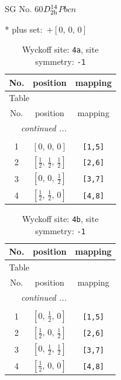 \documentclass[fleqn,8pt]{jsarticle}
\begin{document}
\setcounter{MaxMatrixCols}{32}

\renewcommand{\tablename}{Table~}
\renewcommand{\figurename}{Figure~}
\begin{center}
\LARGE
SG No. 60\quad$D_{\rm 2h}^{14}$\quad$Pbcn$\quad[ orthorhombic ]
\end{center}
* plus set:\,\,\,$+\left[ 0,\, 0,\, 0 \right]$
\renewcommand{\arraystretch}{1.2}
\begin{longtable}{ccc}
\caption{Wyckoff site: {\tt 4a}, site symmetry: {\tt -1}}
 \\
 \hline \hline
No. & position & mapping \\ \hline \endfirsthead

\multicolumn{2}{l}{\tablename\ \thetable{}} \\
 \hline \hline
No. & position & mapping \\ \hline \endhead

 \hline \hline
\multicolumn{2}{r}{\footnotesize\it continued ...} \\ \endfoot

 \hline \hline
\multicolumn{2}{r}{} \\ \endlastfoot

1 & $\left[ 0,\, 0,\, 0 \right]$ & {\tt [1,5]} \\ \hline
2 & $\left[ \frac{1}{2},\, \frac{1}{2},\, \frac{1}{2} \right]$ & {\tt [2,6]} \\ \hline
3 & $\left[ 0,\, 0,\, \frac{1}{2} \right]$ & {\tt [3,7]} \\ \hline
4 & $\left[ \frac{1}{2},\, \frac{1}{2},\, 0 \right]$ & {\tt [4,8]} \\
\end{longtable}
\renewcommand{\arraystretch}{1.2}
\begin{longtable}{ccc}
\caption{Wyckoff site: {\tt 4b}, site symmetry: {\tt -1}}
 \\
 \hline \hline
No. & position & mapping \\ \hline \endfirsthead

\multicolumn{2}{l}{\tablename\ \thetable{}} \\
 \hline \hline
No. & position & mapping \\ \hline \endhead

 \hline \hline
\multicolumn{2}{r}{\footnotesize\it continued ...} \\ \endfoot

 \hline \hline
\multicolumn{2}{r}{} \\ \endlastfoot

1 & $\left[ 0,\, \frac{1}{2},\, 0 \right]$ & {\tt [1,5]} \\ \hline
2 & $\left[ \frac{1}{2},\, 0,\, \frac{1}{2} \right]$ & {\tt [2,6]} \\ \hline
3 & $\left[ 0,\, \frac{1}{2},\, \frac{1}{2} \right]$ & {\tt [3,7]} \\ \hline
4 & $\left[ \frac{1}{2},\, 0,\, 0 \right]$ & {\tt [4,8]} \\
\end{longtable}
\end{document}
